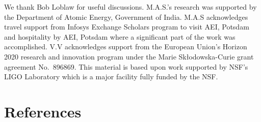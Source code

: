 \documentclass[aps,prd,amsmath,floats,floatfix, twocolumn,
superscriptaddress,nofootinbib,showpacs]{revtex4-1}
\begin{document}
\begin{acknowledgments}
We thank Bob Loblaw for useful discussions.
M.A.S.’s research was supported by the Department of Atomic Energy, Government of
India. M.A.S acknowledges travel support from Infosys Exchange Scholars program to visit
AEI, Potsdam and hospitality by AEI, Potsdam where a significant part of the work was
accomplished.
V.V acknowledges support from the European Union’s Horizon 2020 research and
innovation program under the Marie Skłodowska-Curie grant agreement No.~896869.
This material is based upon work supported by NSF's LIGO Laboratory which is a
major facility fully funded by the NSF.
\end{acknowledgments}

\section*{References}

\end{document}
